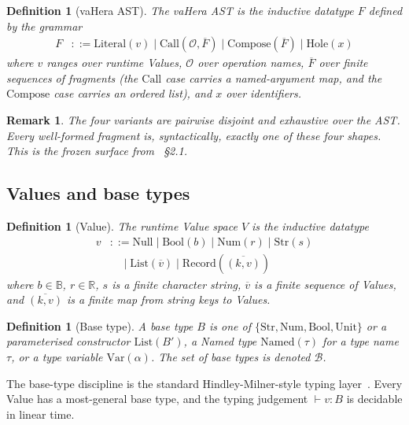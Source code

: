 \documentclass[twocolumn,11pt,a4paper]{article}
\newtheorem{definition}[theorem]{Definition}
\newtheorem{remark}[theorem]{Remark}
\newcommand{\Real}{\mathbb{R}}
\newcommand{\Bool}{\mathbb{B}}
\newcommand{\Frag}{F}
\newcommand{\Op}{\mathcal{O}}
\newcommand{\Val}{V}
\newcommand{\vCall}[2]{\mathrm{Call}(#1,#2)}
\newcommand{\vComp}[1]{\mathrm{Compose}(#1)}
\newcommand{\vLit}[1]{\mathrm{Literal}(#1)}
\newcommand{\vHol}[1]{\mathrm{Hole}(#1)}
\begin{document}
\begin{definition}[vaHera AST]
\label{def:vahera-ast}
The vaHera AST is the inductive datatype $\Frag$ defined by the grammar
\begin{align*}
\Frag &::= \vLit{v} \mid \vCall{\Op}{\overline{\Frag}} \mid \vComp{\overline{\Frag}} \mid \vHol{x}
\end{align*}
where $v$ ranges over runtime Values, $\Op$ over operation names, $\overline{\Frag}$ over finite sequences of fragments (the $\mathrm{Call}$ case carries a named-argument map, and the $\mathrm{Compose}$ case carries an ordered list), and $x$ over identifiers.
\end{definition}

\begin{remark}
The four variants are pairwise disjoint and exhaustive over the AST. Every well-formed fragment is, syntactically, exactly one of these four shapes. This is the frozen surface from~\citet{sachikonye2026integration} §2.1.
\end{remark}

\subsection{Values and base types}

\begin{definition}[Value]
\label{def:value}
The runtime Value space $\Val$ is the inductive datatype
\begin{align*}
v &::= \mathrm{Null} \mid \mathrm{Bool}(b) \mid \mathrm{Num}(r) \mid \mathrm{Str}(s) \\
  &\quad\mid \mathrm{List}(\overline{v}) \mid \mathrm{Record}(\overline{(k, v)})
\end{align*}
where $b \in \Bool$, $r \in \Real$, $s$ is a finite character string, $\overline{v}$ is a finite sequence of Values, and $\overline{(k,v)}$ is a finite map from string keys to Values.
\end{definition}

\begin{definition}[Base type]
\label{def:base-type}
A base type $B$ is one of $\{\mathrm{Str}, \mathrm{Num}, \mathrm{Bool}, \mathrm{Unit}\}$ or a parameterised constructor $\mathrm{List}(B')$, a Named type $\mathrm{Named}(\tau)$ for a type name $\tau$, or a type variable $\mathrm{Var}(\alpha)$. The set of base types is denoted $\mathcal{B}$.
\end{definition}

The base-type discipline is the standard Hindley-Milner-style typing layer~\citep{hindley1969principal,milner1978theory,damas1982principal}. Every Value has a most-general base type, and the typing judgement $\vdash v : B$ is decidable in linear time.
\end{document}
